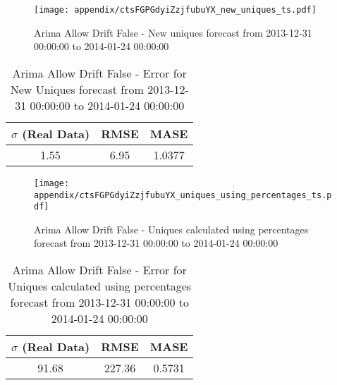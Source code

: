 \begin{figure}[H] \begin{center} \leavevmode
\texttt{[image: appendix/ctsFGPGdyiZzjfubuYX\_new\_uniques\_ts.pdf]} \caption[]{
Arima Allow Drift False - New uniques forecast from 2013-12-31 00:00:00 to 2014-01-24 00:00:00} \label{fig:appendix/ctsFGPGdyiZzjfubuYX_new_uniques_ts.pdf} \end{center}
\end{figure}

\begin{table}[H]
\centering
\footnotesize
\begin{tabular}{ccc}
$\sigma$ (Real Data) & RMSE & MASE   \\ \hline
1.55 & 6.95 & 1.0377 \\
\end{tabular}

\vspace{0.5cm}

\caption[]{
Arima Allow Drift False - Error for New Uniques forecast from 2013-12-31 00:00:00 to 2014-01-24 00:00:00}
\end{table}

\begin{figure}[H] \begin{center} \leavevmode
\texttt{[image: appendix/ctsFGPGdyiZzjfubuYX\_uniques\_using\_percentages\_ts.pdf]} \caption[]{
Arima Allow Drift False - Uniques calculated using percentages forecast from 2013-12-31 00:00:00 to 2014-01-24 00:00:00} \label{fig:appendix/ctsFGPGdyiZzjfubuYX_uniques_using_percentages_ts.pdf} \end{center}
\end{figure}

\begin{table}[H]
\centering
\footnotesize
\begin{tabular}{ccc}
$\sigma$ (Real Data) & RMSE & MASE   \\ \hline
91.68 & 227.36 & 0.5731 \\
\end{tabular}

\vspace{0.5cm}

\caption[]{
Arima Allow Drift False - Error for Uniques calculated using percentages forecast from 2013-12-31 00:00:00 to 2014-01-24 00:00:00}
\end{table}

